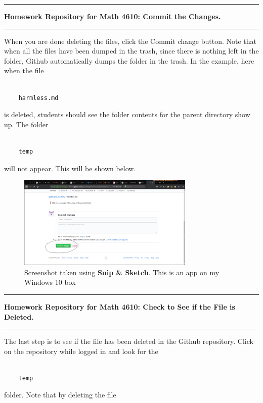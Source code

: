 \documentclass[10pt,fleqn]{article}
\begin{document}
\vskip0.1in\hrule\vskip0.1in
\noindent
{\bf Homework Repository for Math 4610: Commit the Changes.} 
\vskip0.1in\hrule\vskip0.1in
\vfill
When you are done deleting the files, click the Commit change button. Note that
when all the files have been dumped in the trash, since there is nothing left in
the folder, Github automatically dumps the folder in the trash. In the example,
here when the file 
\begin{verbatim}

    harmless.md

\end{verbatim}
is deleted, students should see the folder contents for the parent directory
show up. The folder
\begin{verbatim}

    temp

\end{verbatim}
will not appear. This will be shown below.
\begin{figure}[h]
\centering
\includegraphics[width=0.75\textwidth]{../images/github_16.png}
\caption{{Screenshot} taken using {\bf Snip \& Sketch}. This is an app on
         my Windows 10 box}
\end{figure}
\vskip0.1in\hrule\vskip0.1in
\noindent
{\bf Homework Repository for Math 4610: Check to See if the File is Deleted.} 
\vskip0.1in\hrule\vskip0.1in
\vfill
The last step is to see if the file has been deleted in the Github repository.
Click on the repository while logged in and look for the
\begin{verbatim}

    temp

\end{verbatim}
folder. Note that by deleting the file
\end{document}
